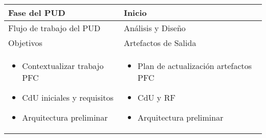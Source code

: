 \vspace{1cm}
\begin{tabular}{|p{}|p{}|}

\hline

\cellcolor[gray]{0.7}Fase del \acs{PUD} & Inicio 
 \\
\hline

\cellcolor[gray]{0.7}Flujo de trabajo del \acs{PUD} & Análisis y Diseño
 \\
\hline

\cellcolor[gray]{0.7}Objetivos  &
\cellcolor[gray]{0.7}Artefactos de Salida \\
\hline

\begin{itemize}
\item Contextualizar trabajo \acs{PFC}
\item \acs{CdU} iniciales y requisitos
\item Arquitectura preliminar
\end{itemize}

&

\begin{itemize}
\item Plan de actualización artefactos \acs{PFC}
\item \acs{CdU} y \acs{RF}
\item Arquitectura preliminar
\end{itemize} \\
\hline
\end{tabular}



